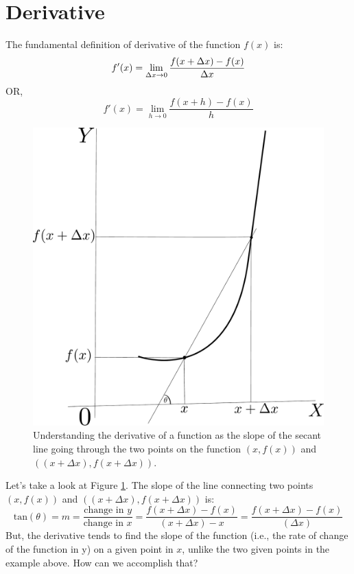 \documentclass[conference,final,11pt,technote,onecolumn]{IEEEtran}\usepackage[]{graphicx}\usepackage[]{color}
\begin{document}
\section{Derivative}
\label{term:derivative}
The fundamental definition of derivative of the function $f(x)$ is:
\begin{equation}
f'(x) = \lim_{\Delta x\rightarrow 0}\dfrac{f(x+\Delta x)-f(x)}{\Delta x}\label{eqn:derivative-1}\\
\end{equation}
OR,
\begin{equation}
\nonumber f'(x) = \lim_{h\rightarrow 0}\dfrac{f(x+h)-f(x)}{h}
\end{equation}

\begin{figure}[!h]
	\centering
	\includegraphics[scale=0.25]{figures/derivative-1.pdf}
	\caption{Understanding the derivative of a function as the slope of the secant line going through the two points on the function $(x,f(x))$ and $((x+\Delta x),f(x+\Delta x))$.\label{fig:derivative-1}}
\end{figure}
Let's take a look at Figure \ref{fig:derivative-1}. The slope of the line connecting two points $(x,f(x))$ and $( (x+\Delta x),f(x+\Delta x))$ is:
\begin{equation}
\nonumber \text{tan}(\theta) = m = \dfrac{\text{change in $y$}}{\text{change in $x$}} = \dfrac{f(x+\Delta x) - f(x)}{(x+\Delta x)-x} = \dfrac{f(x+\Delta x) - f(x)}{(\Delta x)} 
\end{equation}
But, the derivative tends to find the slope of the function (i.e., the rate of change of the function in y) on a given point in $x$, unlike the two given points in the example above. How can we accomplish that? 
\end{document}
